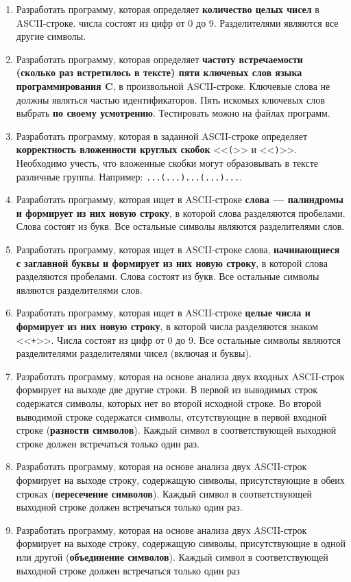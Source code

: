 \documentclass[a4paper, 12pt, oneside]{article}
\begin{document}
\begin{enumerate}
    \item Разработать программу, которая определяет \textbf{количество целых чисел} в ASCII-строке. числа состоят из цифр от 0 до 9. Разделителями являются все другие символы.
    \item Разработать программу, которая определяет \textbf{частоту встречаемости (сколько раз встретилось в тексте) пяти ключевых слов языка программирования C}, в произвольной  ASCII-строке. Ключевые слова не должны являться частью идентификаторов. Пять искомых ключевых слов выбрать \textbf{по своему усмотрению}. Тестировать можно на файлах программ.
    \item Разработать программу, которая в заданной ASCII-строке определяет \textbf{корректность вложенности круглых скобок} <<\verb|(|>> и <<\verb|)|>>. Необходимо учесть, что вложенные скобки могут образовывать в тексте различные группы. Например: \verb|...(...)...(...)...|.
    \item Разработать программу, которая ищет в ASCII-строке \textbf{слова --- палиндромы и формирует из них новую строку}, в которой слова разделяются пробелами. Слова состоят из букв. Все остальные символы являются разделителями слов.
    \item Разработать программу, которая ищет в ASCII-строке слова, \textbf{начинающиеся с заглавной буквы и формирует из них новую строку}, в которой слова разделяются пробелами. Слова состоят из букв. Все остальные символы являются разделителями слов.
    \item Разработать программу, которая ищет в ASCII-строке \textbf{целые числа и формирует из них новую строку}, в которой числа разделяются знаком <<\verb|+|>>. Числа состоят из цифр от 0 до 9. Все остальные символы являются разделителями разделителями чисел (включая и буквы).
    \item Разработать программу, которая на основе анализа двух входных ASCII-строк формирует на выходе две другие строки. В первой из выводимых строк содержатся символы, которых нет во второй исходной строке. Во второй выводимой строке содержатся символы, отсутствующие в первой входной строке (\textbf{разности символов}). Каждый символ в соответствующей выходной строке должен встречаться только один раз.
    \item Разработать программу, которая на основе анализа двух ASCII-строк формирует на выходе строку, содержащую символы, присутствующие в обеих строках (\textbf{пересечение символов}). Каждый символ в соответствующей выходной строке должен встречаться только один раз.
    \item Разработать программу, которая на основе анализа двух ASCII-строк формирует на выходе строку, содержащую символы, присутствующие в одной или другой (\textbf{объединение символов}). Каждый символ в соответствующей выходной строке должен встречаться только один раз
\end{enumerate}
\end{document}
